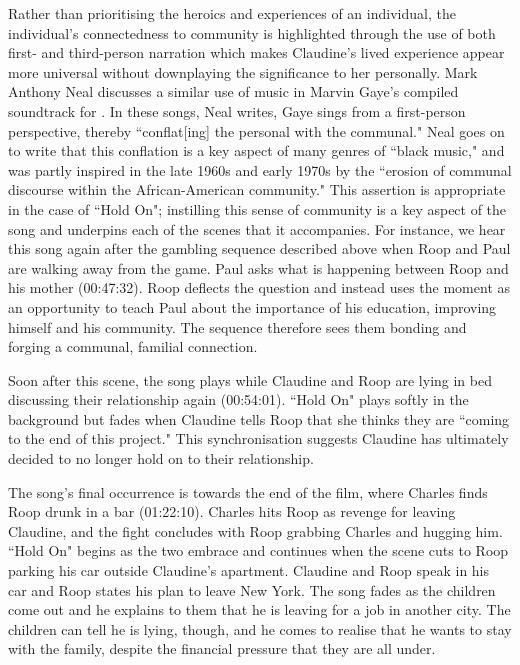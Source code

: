 Rather than prioritising the heroics and experiences of an individual, the individual's connectedness to community is highlighted through the use of both first- and third-person narration which makes Claudine's lived experience appear more universal without downplaying the significance to her personally.
Mark Anthony Neal discusses a similar use of music in Marvin Gaye's compiled soundtrack for \textcite{dixon_trouble_1972}.
In these songs, Neal writes, Gaye sings from a first-person perspective, thereby ``conflat[ing] the personal with the communal."\autocite[][68]{neal_what_1999}
Neal goes on to write that this conflation is a key aspect of many genres of ``black music," and was partly inspired in the late 1960s and early 1970s by the ``erosion of communal discourse within the African-American community."\autocite[][65]{neal_what_1999}
This assertion is appropriate in the case of ``Hold On"; instilling this sense of community is a key aspect of the song and underpins each of the scenes that it accompanies.
For instance, we hear this song again after the gambling sequence described above when Roop and Paul are walking away from the game.
Paul asks what is happening between Roop and his mother (00:47:32).
Roop deflects the question and instead uses the moment as an opportunity to teach Paul about the importance of his education, improving himself and his community.
The sequence therefore sees them bonding and forging a communal, familial connection.

Soon after this scene, the song plays while Claudine and Roop are lying in bed discussing their relationship again (00:54:01).
``Hold On" plays softly in the background but fades when Claudine tells Roop that she thinks they are ``coming to the end of this project."
This synchronisation suggests Claudine has ultimately decided to no longer hold on to their relationship.


The song's final occurrence is towards the end of the film, where Charles finds Roop drunk in a bar (01:22:10).
Charles hits Roop as revenge for leaving Claudine, and the fight concludes with Roop grabbing Charles and hugging him.
``Hold On" begins as the two embrace and continues when the scene cuts to Roop parking his car outside Claudine's apartment.
Claudine and Roop speak in his car and Roop states his plan to leave New York.
The song fades as the children come out and he explains to them that he is leaving for a job in another city.
The children can tell he is lying, though, and he comes to realise that he wants to stay with the family, despite the financial pressure that they are all under.

